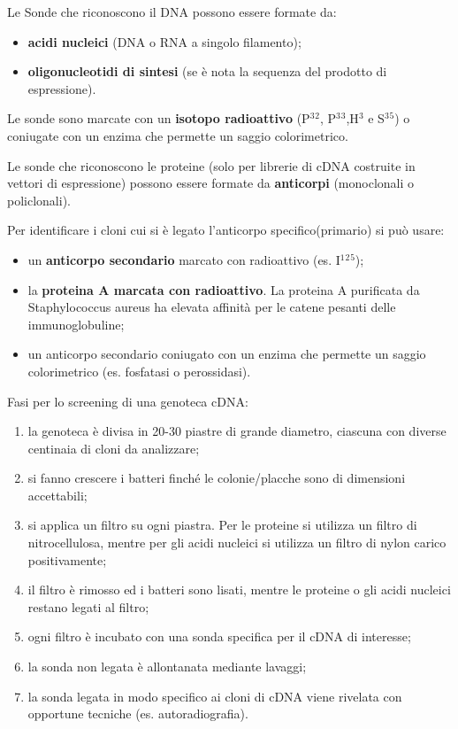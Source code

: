 \documentclass[]{article}
\begin{document}
Le Sonde che riconoscono il DNA possono essere formate da:

\begin{itemize}
\itemsep1pt\parskip0pt
\item
  \textbf{acidi nucleici} (DNA o RNA a singolo filamento);
\item
  \textbf{oligonucleotidi di sintesi} (se è nota la sequenza del
  prodotto di espressione).
\end{itemize}

Le sonde sono marcate con un \textbf{isotopo radioattivo}
(P\(^3\)\(^2\), P\(^3\)\(^3\),H\(^3\) e S\(^3\)\(^5\)) o coniugate con
un enzima che permette un saggio colorimetrico.

Le sonde che riconoscono le proteine (solo per librerie di cDNA
costruite in vettori di espressione) possono essere formate da
\textbf{anticorpi} (monoclonali o policlonali).

Per identificare i cloni cui si è legato l'anticorpo specifico(primario)
si può usare:

\begin{itemize}
\itemsep1pt\parskip0pt
\item
  un \textbf{anticorpo secondario} marcato con radioattivo (es.
  I\(^1\)\(^2\)\(^5\));
\item
  la \textbf{proteina A marcata con radioattivo}. La proteina A
  purificata da Staphylococcus aureus ha elevata affinità per le catene
  pesanti delle immunoglobuline;
\item
  un anticorpo secondario coniugato con un enzima che permette un saggio
  colorimetrico (es. fosfatasi o perossidasi).
\end{itemize}

Fasi per lo screening di una genoteca cDNA:

\begin{enumerate}
\def\labelenumi{\arabic{enumi}.}
\itemsep1pt\parskip0pt
\item
  la genoteca è divisa in 20-30 piastre di grande diametro, ciascuna con
  diverse centinaia di cloni da analizzare;
\item
  si fanno crescere i batteri finché le colonie/placche sono di
  dimensioni accettabili;
\item
  si applica un filtro su ogni piastra. Per le proteine si utilizza un
  filtro di nitrocellulosa, mentre per gli acidi nucleici si utilizza un
  filtro di nylon carico positivamente;
\item
  il filtro è rimosso ed i batteri sono lisati, mentre le proteine o gli
  acidi nucleici restano legati al filtro;
\item
  ogni filtro è incubato con una sonda specifica per il cDNA di
  interesse;
\item
  la sonda non legata è allontanata mediante lavaggi;
\item
  la sonda legata in modo specifico ai cloni di cDNA viene rivelata con
  opportune tecniche (es. autoradiografia).
\end{enumerate}
\end{document}
